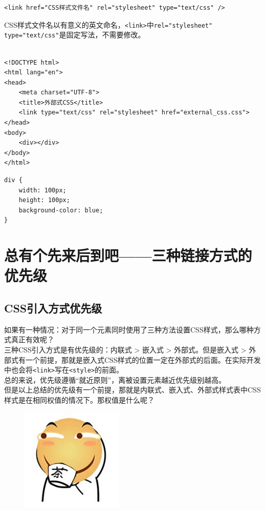\begin{lstlisting}[style=htmlcssjs]
<link href="CSS样式文件名" rel="stylesheet" type="text/css" />
\end{lstlisting}

CSS样式文件名以有意义的英文命名，\lstinline|<link>|中\lstinline|rel="stylesheet" type="text/css"|是固定写法，不需要修改。 \\

 \\
\begin{lstlisting}[style=htmlcssjs, title=external\_css.html]
<!DOCTYPE html>
<html lang="en">
<head>
    <meta charset="UTF-8">
    <title>外部式CSS</title>
    <link type="text/css" rel="stylesheet" href="external_css.css">
</head>
<body>
    <div></div>
</body>
</html>
\end{lstlisting}

\begin{lstlisting}[style=htmlcssjs, title=external\_css.css]
div {
    width: 100px;
    height: 100px;
    background-color: blue;
}
\end{lstlisting}

\newpage

\section{总有个先来后到吧——三种链接方式的优先级}

\subsection{CSS引入方式优先级}

如果有一种情况：对于同一个元素同时使用了三种方法设置CSS样式，那么哪种方式真正有效呢？ \\

三种CSS引入方式是有优先级的：内联式 > 嵌入式 > 外部式。但是嵌入式 > 外部式有一个前提，那就是嵌入式CSS样式的位置一定在外部式的后面。在实际开发中也会将\lstinline|<link>|写在\lstinline|<style>|的前面。 \\

总的来说，优先级遵循“就近原则”，离被设置元素越近优先级别越高。 \\

但是以上总结的优先级有一个前提，那就是内联式、嵌入式、外部式样式表中CSS样式是在相同权值的情况下。那权值是什么呢？

\begin{figure}[H]
    \centering
    \includegraphics[]{img/C5/5-5/1.png}
\end{figure}


